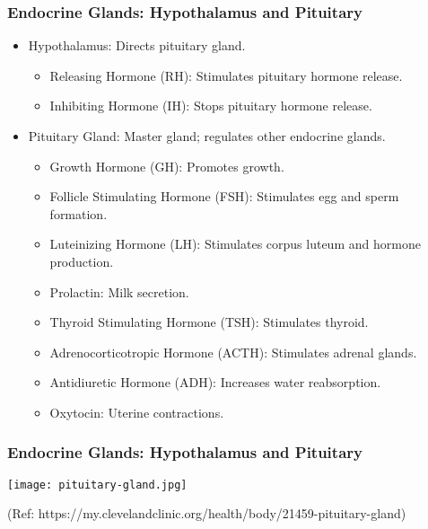 \begin{frame}[fragile]\frametitle{Endocrine Glands: Hypothalamus and Pituitary}

      \begin{itemize}
		\item Hypothalamus: Directs pituitary gland.
		  \begin{itemize}
		    \item Releasing Hormone (RH): Stimulates pituitary hormone release.
		    \item Inhibiting Hormone (IH): Stops pituitary hormone release.
		  \end{itemize}
		\item Pituitary Gland: Master gland; regulates other endocrine glands.
		  \begin{itemize}
		    \item Growth Hormone (GH): Promotes growth.
		    \item Follicle Stimulating Hormone (FSH): Stimulates egg and sperm formation.
		    \item Luteinizing Hormone (LH): Stimulates corpus luteum and hormone production.
		    \item Prolactin: Milk secretion.
		    \item Thyroid Stimulating Hormone (TSH): Stimulates thyroid.
		    \item Adrenocorticotropic Hormone (ACTH): Stimulates adrenal glands.
		    \item Antidiuretic Hormone (ADH): Increases water reabsorption.
		    \item Oxytocin: Uterine contractions.
		  \end{itemize}
	  \end{itemize}

\end{frame}

\begin{frame}[fragile]\frametitle{Endocrine Glands: Hypothalamus and Pituitary}

		\begin{center}
		\texttt{[image: pituitary-gland.jpg]}
		
		{\tiny (Ref: https://my.clevelandclinic.org/health/body/21459-pituitary-gland)}
		\end{center}	

\end{frame}


